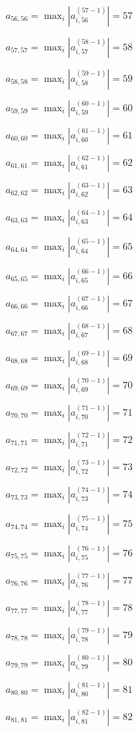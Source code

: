 \documentclass[a4paper,12pt]{article}
\begin{document}
$a _{ 56, 56 } =  \max _i |a _{ i, 56 } ^{ (57 - 1) } | = 57$

$a _{ 57, 57 } =  \max _i |a _{ i, 57 } ^{ (58 - 1) } | = 58$

$a _{ 58, 58 } =  \max _i |a _{ i, 58 } ^{ (59 - 1) } | = 59$

$a _{ 59, 59 } =  \max _i |a _{ i, 59 } ^{ (60 - 1) } | = 60$

$a _{ 60, 60 } =  \max _i |a _{ i, 60 } ^{ (61 - 1) } | = 61$

$a _{ 61, 61 } =  \max _i |a _{ i, 61 } ^{ (62 - 1) } | = 62$

$a _{ 62, 62 } =  \max _i |a _{ i, 62 } ^{ (63 - 1) } | = 63$

$a _{ 63, 63 } =  \max _i |a _{ i, 63 } ^{ (64 - 1) } | = 64$

$a _{ 64, 64 } =  \max _i |a _{ i, 64 } ^{ (65 - 1) } | = 65$

$a _{ 65, 65 } =  \max _i |a _{ i, 65 } ^{ (66 - 1) } | = 66$

$a _{ 66, 66 } =  \max _i |a _{ i, 66 } ^{ (67 - 1) } | = 67$

$a _{ 67, 67 } =  \max _i |a _{ i, 67 } ^{ (68 - 1) } | = 68$

$a _{ 68, 68 } =  \max _i |a _{ i, 68 } ^{ (69 - 1) } | = 69$

$a _{ 69, 69 } =  \max _i |a _{ i, 69 } ^{ (70 - 1) } | = 70$

$a _{ 70, 70 } =  \max _i |a _{ i, 70 } ^{ (71 - 1) } | = 71$

$a _{ 71, 71 } =  \max _i |a _{ i, 71 } ^{ (72 - 1) } | = 72$

$a _{ 72, 72 } =  \max _i |a _{ i, 72 } ^{ (73 - 1) } | = 73$

$a _{ 73, 73 } =  \max _i |a _{ i, 73 } ^{ (74 - 1) } | = 74$

$a _{ 74, 74 } =  \max _i |a _{ i, 74 } ^{ (75 - 1) } | = 75$

$a _{ 75, 75 } =  \max _i |a _{ i, 75 } ^{ (76 - 1) } | = 76$

$a _{ 76, 76 } =  \max _i |a _{ i, 76 } ^{ (77 - 1) } | = 77$

$a _{ 77, 77 } =  \max _i |a _{ i, 77 } ^{ (78 - 1) } | = 78$

$a _{ 78, 78 } =  \max _i |a _{ i, 78 } ^{ (79 - 1) } | = 79$

$a _{ 79, 79 } =  \max _i |a _{ i, 79 } ^{ (80 - 1) } | = 80$

$a _{ 80, 80 } =  \max _i |a _{ i, 80 } ^{ (81 - 1) } | = 81$

$a _{ 81, 81 } =  \max _i |a _{ i, 81 } ^{ (82 - 1) } | = 82$
\end{document}
